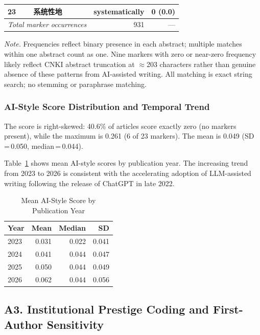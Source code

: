 \documentclass[12pt,a4paper]{article}
\begin{document}
\begin{table}[htbp]
\begin{threeparttable}
\begin{tabular}{llrr}
23 & 系统性地  & systematically            &   0 (0.0)  \\
\midrule
\multicolumn{2}{l}{\textit{Total marker occurrences}} & 931 & --- \\
\bottomrule
\end{tabular}
\begin{tablenotes}
\footnotesize
\item \textit{Note.} Frequencies reflect binary presence in each abstract;
  multiple matches within one abstract count as one.
  Nine markers with zero or near-zero frequency likely reflect CNKI
  abstract truncation at $\approx$203 characters rather than genuine
  absence of these patterns from AI-assisted writing.
  All matching is exact string search; no stemming or paraphrase matching.
\end{tablenotes}
\end{threeparttable}
\end{table}

\subsubsection*{AI-Style Score Distribution and Temporal Trend}

The score is right-skewed: 40.6\% of articles score exactly zero
(no markers present), while the maximum is 0.261
(6 of 23 markers). The mean is 0.049 (SD\,=\,0.050, median\,=\,0.044).

Table~\ref{tab:aitrend} shows mean AI-style scores by publication year.
The increasing trend from 2023 to 2026 is consistent with the
accelerating adoption of LLM-assisted writing following the release
of ChatGPT in late 2022.

\begin{table}[htbp]
\centering
\caption{Mean AI-Style Score by Publication Year}
\label{tab:aitrend}
\begin{tabular}{lrrr}
\toprule
Year & Mean & Median & SD \\
\midrule
2023 & 0.031 & 0.022 & 0.041 \\
2024 & 0.041 & 0.044 & 0.047 \\
2025 & 0.050 & 0.044 & 0.049 \\
2026 & 0.062 & 0.044 & 0.056 \\
\bottomrule
\end{tabular}
\end{table}

\subsection*{A3. Institutional Prestige Coding and First-Author Sensitivity}
\end{document}

